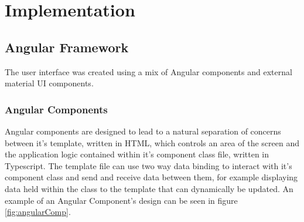 \documentclass{l4proj}
\begin{document}
\chapter{Implementation}
\section{Angular Framework}
The user interface was created using a mix of Angular components and external material UI components.
\subsection{Angular Components}
Angular components are designed to lead to a natural separation of concerns between it's template, written in HTML, which controls an area of the screen and the application logic contained within it's component class file, written in Typescript. The template file can use two way data binding to interact with it's component class and send and receive data between them, for example displaying data held within the class to the template that can dynamically be updated. An example of an Angular Component's design can be seen in figure \ref{fig:angularComp}.
\end{document}
